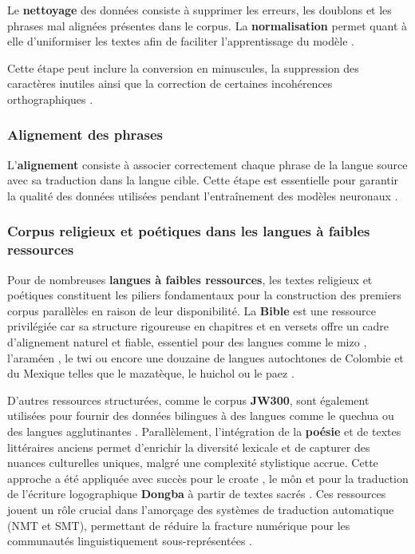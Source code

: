 Le \textbf{nettoyage} des données consiste à supprimer les erreurs, les doublons et les phrases mal alignées présentes dans le corpus. La \textbf{normalisation} permet quant à elle d'uniformiser les textes afin de faciliter l'apprentissage du modèle \cite{sharma2023fully}.

Cette étape peut inclure la conversion en minuscules, la suppression des caractères inutiles ainsi que la correction de certaines incohérences orthographiques \cite{ali2026hybrid}.

\subsubsection{Alignement des phrases}

L'\textbf{alignement} consiste à associer correctement chaque phrase de la langue source avec sa traduction dans la langue cible. Cette étape est essentielle pour garantir la qualité des données utilisées pendant l'entraînement des modèles neuronaux \cite{ali2026hybrid, haulai2023construction}.

\subsubsection{Corpus religieux et poétiques dans les langues à faibles ressources}

Pour de nombreuses \textbf{langues à faibles ressources}, les textes religieux et poétiques constituent les piliers fondamentaux pour la construction des premiers corpus parallèles en raison de leur disponibilité. La \textbf{Bible} est une ressource privilégiée car sa structure rigoureuse en chapitres et en versets offre un cadre d'alignement naturel et fiable, essentiel pour des langues comme le mizo \cite{chanambam2022, haulai2023construction}, l'araméen \cite{liebeskind2024machine}, le twi \cite{agyei2024low} ou encore une douzaine de langues autochtones de Colombie et du Mexique telles que le mazatèque, le huichol ou le paez \cite{angel2023comparing}.

D'autres ressources structurées, comme le corpus \textbf{JW300}, sont également utilisées pour fournir des données bilingues à des langues comme le quechua ou des langues agglutinantes \cite{chen-fazio-2021-morphologically, kann2022americasnli}. Parallèlement, l'intégration de la \textbf{poésie} et de textes littéraires anciens permet d'enrichir la diversité lexicale et de capturer des nuances culturelles uniques, malgré une complexité stylistique accrue. Cette approche a été appliquée avec succès pour le croate \cite{dundjer2020automatic}, le môn \cite{tun2025exploring} et pour la traduction de l'écriture logographique \textbf{Dongba} à partir de textes sacrés \cite{ma2025dongba}. Ces ressources jouent un rôle crucial dans l'amorçage des systèmes de traduction automatique (\ac{NMT} et \ac{SMT}), permettant de réduire la fracture numérique pour les communautés linguistiquement sous-représentées \cite{ranathunga2023neural}.

